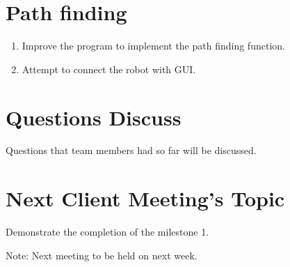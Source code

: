 \documentclass[11pt, a4paper]{article}
\begin{document}
\section{Path finding}
\begin{enumerate}
\item Improve the program to implement the path finding function.
\item Attempt to connect the robot with GUI.
\end{enumerate}

\section{Questions Discuss}
Questions that team members had so far will be discussed.

\section{Next Client Meeting's Topic}
Demonstrate the completion of the milestone 1. 

\vspace*{10pt}
\noindent Note: Next meeting to be held on next week.
\end{document}
